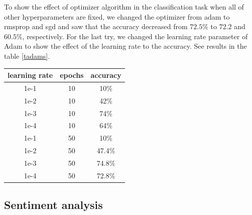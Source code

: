 \documentclass[10pt]{SelfArx} %
\begin{document}
	To show the effect of optimizer algorithm in the classification task when all of other hyperparameters are fixed, we changed the optimizer from adam to rmsprop and sgd and saw that the accuracy decreased from $72.5\%$ to $72.2$ and $60.5\%$, respectively. 
	For the last try, we changed the learning rate parameter of Adam to show the effect of the learning rate to the accuracy.  See results in the table \ref{tadams}.
	\begin{center}
		\begin{tabular*}{.85\linewidth}{@{\extracolsep{\fill} }ccc@{}}
			\toprule
			learning rate & epochs &accuracy \\ \midrule
			1e-1&10 & 10\% \\
			1e-2&10 & 42\% \\
			1e-3 &10& 74\% \\
			1e-4 &10& 64\% \\ 
			
			1e-1 &50 & 10\% \\
			1e-2 &50 & 47.4\% \\
			1e-3 &50& 74.8\% \\
			1e-4 &50& 72.8\% \\ 
			\bottomrule
		\end{tabular*}
		\label{tadams}
	\end{center}
	
	\subsection{Sentiment analysis}
	
\end{document}
